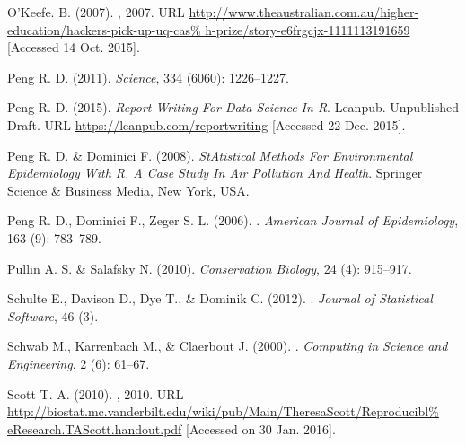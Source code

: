 \documentclass[11pt,a4paper]{article}
\begin{document}
\begin{thebibliography}{30}
O'Keefe. B. (2007).
, 2007.
\newblock URL
  \url{http://www.theaustralian.com.au/higher-education/hackers-pick-up-uq-cas%
h-prize/story-e6frgcjx-1111113191659} [Accessed 14 Oct. 2015].

Peng R. D. (2011).
\newblock \emph{Science}, 334 (6060): 1226--1227.

Peng R. D. (2015).
\newblock \emph{{Report Writing For Data Science In R}}.
\newblock Leanpub. Unpublished Draft.
\newblock URL \url{https://leanpub.com/reportwriting} [Accessed 22 Dec. 2015].

Peng R. D. \& Dominici F. (2008).
\newblock \emph{{StAtistical Methods For Environmental Epidemiology With R. A
  Case Study In Air Pollution And Health}}.
\newblock Springer Science {\&} Business Media, New York, USA.

Peng R. D., Dominici F., Zeger S. L. (2006).
.
\newblock \emph{American Journal of Epidemiology}, 163 (9):
  783--789.

Pullin A. S.  \& Salafsky N.   (2010).
\newblock \emph{Conservation Biology}, 24 (4): 915--917.


Schulte E., Davison D., Dye T., \& Dominik C. (2012).
.
\newblock \emph{Journal of Statistical Software}, 46 (3).

Schwab M., Karrenbach M., \& Claerbout J. (2000).
.
\newblock \emph{Computing in Science and Engineering}, 2 (6):
  61--67.


Scott T. A. (2010).
, 2010.
\newblock URL
  \url{http://biostat.mc.vanderbilt.edu/wiki/pub/Main/TheresaScott/Reproducibl%
eResearch.TAScott.handout.pdf} [Accessed on 30 Jan. 2016].


\end{thebibliography}
\end{document}
